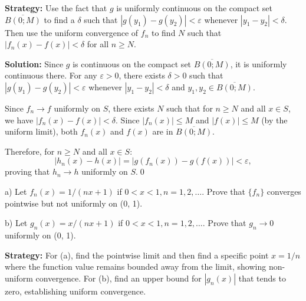 \noindent\textbf{Strategy:} Use the fact that \( g \) is uniformly continuous on the compact set \( \overline{B(0; M)} \) to find a \( \delta \) such that \( |g(y_1) - g(y_2)| < \varepsilon \) whenever \( |y_1 - y_2| < \delta \). Then use the uniform convergence of \( f_n \) to find \( N \) such that \( |f_n(x) - f(x)| < \delta \) for all \( n \geq N \).

\bigskip\noindent\textbf{Solution:} Since \( g \) is continuous on the compact set \( \overline{B(0; M)} \), it is uniformly continuous there. For any \( \varepsilon > 0 \), there exists \( \delta > 0 \) such that \( |g(y_1) - g(y_2)| < \varepsilon \) whenever \( |y_1 - y_2| < \delta \) and \( y_1, y_2 \in \overline{B(0; M)} \).

Since \( f_n \to f \) uniformly on \( S \), there exists \( N \) such that for \( n \geq N \) and all \( x \in S \), we have \( |f_n(x) - f(x)| < \delta \). Since \( |f_n(x)| \leq M \) and \( |f(x)| \leq M \) (by the uniform limit), both \( f_n(x) \) and \( f(x) \) are in \( \overline{B(0; M)} \).

Therefore, for \( n \geq N \) and all \( x \in S \):
\[|h_n(x) - h(x)| = |g(f_n(x)) - g(f(x))| < \varepsilon,\]
proving that \( h_n \to h \) uniformly on \( S \).\qed


\begin{problembox}
\begin{problemstatement}
a) Let \( f_n(x) = 1/(nx + 1) \) if \( 0 < x < 1, n = 1, 2, \ldots \). Prove that \( \{f_n\} \) converges pointwise but not uniformly on (0, 1).

b) Let \( g_n(x) = x/(nx + 1) \) if \( 0 < x < 1, n = 1, 2, \ldots \). Prove that \( g_n \to 0 \) uniformly on (0, 1).
\end{problemstatement}
\end{problembox}

\noindent\textbf{Strategy:} For (a), find the pointwise limit and then find a specific point \( x = 1/n \) where the function value remains bounded away from the limit, showing non-uniform convergence. For (b), find an upper bound for \( |g_n(x)| \) that tends to zero, establishing uniform convergence.

